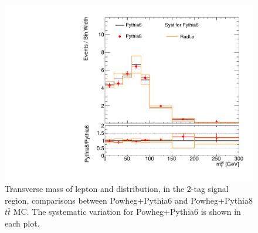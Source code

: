 \begin{figure}[!h]
\begin{center}
\includegraphics[scale=0.33]{./figures/boosted/TTBarPy6VsPy8/TTBarPy6VsPy8_SR_WlepMtATLAS_radlo}
\caption{Transverse mass of lepton and \met  distribution, in the 2-tag signal region, comparisons between Powheg+Pythia6 and Powheg+Pythia8 $t\bar{t}$ MC. 
The systematic variation for Powheg+Pythia6 is shown in each plot.}
\label{fig:boosted_ttbarpy6py8_WlepMtATLAS}
\end{center}
\end{figure}




